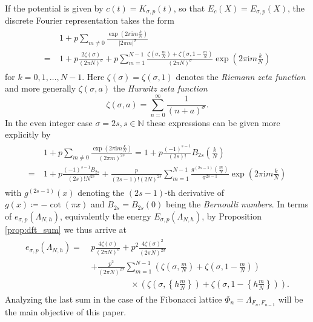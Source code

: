 \documentclass[]{interact}
\newcommand{\bbN}{\mathbb{N}}
\newcommand{\iu}{\mathrm{i}}
\theoremstyle{definition}
\numberwithin{table}{section} %
\numberwithin{figure}{section}
\begin{document}
If the potential is given by $c(t) = K_{\sigma, p}(t)$, so that $E_c(X) = E_{\sigma, p}(X)$, the discrete Fourier representation takes the form \cite{CK95}
\begin{align} \label{eq:dft_sigma}
    \begin{split}
        & 1 + p \sum_{m \neq 0} \frac{\exp\left(2\pi \iu m \frac kN\right)}{|2\pi m|^{\sigma}} \\
    = ~ & 1 + p \frac{2 \zeta(\sigma)}{(2\pi N)^{\sigma}} + p \sum_{m=1}^{N-1} \frac{\zeta\left(\sigma, \frac mN\right) + \zeta\left(\sigma, 1-\frac mN\right)}{(2 \pi N)^{\sigma}} \exp\left(2\pi\iu m \frac kN\right)
    \end{split}
\end{align}
for $k=0, 1, \dots, N-1$. Here $\zeta(\sigma) = \zeta(\sigma, 1)$ denotes the \emph{Riemann zeta function} and more generally $\zeta(\sigma, a)$ the \emph{Hurwitz zeta function}
$$
\zeta(\sigma, a) = \sum_{n=0}^\infty \frac1{(n+a)^\sigma}.
$$
In the even integer case $\sigma=2s, s \in \bbN$ these expressions can be given more explicitly by \cite{Cvi09}
\begin{align} \label{eq:Bernoulli_dft}
    \begin{split}
        & 1 + p \sum_{m \neq 0} \frac{\exp\left(2\pi\iu m \frac kN\right)}{(2 \pi m)^{2s}} = 1 + p \frac{(-1)^{s-1}}{(2s)!} B_{2s}\left(\frac kN\right) \\
    = ~ & 1 + p \frac{(-1)^{s-1}B_{2s}}{(2s)!N^{2s}} + \frac{p}{(2s-1)! (2N)^{2s}}\sum_{m=1}^{N-1} \frac{g^{(2s-1)}\left(\frac mN\right)}{\pi^{2s-1}} \exp\left(2\pi\iu m \frac kN\right)
    \end{split}
\end{align}
with $g^{(2s-1)}(x)$ denoting the $(2s-1)$-th derivative of $g(x) \coloneqq - \cot(\pi x)$ and $B_{2s} = B_{2s}(0)$ being the \emph{Bernoulli numbers}. In terms of $e_{\sigma, p}(\Lambda_{N,h})$, equivalently the energy $E_{\sigma, p}(\Lambda_{N, h})$, by Proposition \ref{prop:dft_sum} we thus arrive at
\begin{align} \label{eq:wce_expression}
    \begin{split}
        e_{\sigma, p}(\Lambda_{N, h})
    = ~ & p \frac{4 \zeta(\sigma)}{(2\pi N)^{\sigma}} + p^2 \frac{4 \zeta(\sigma)^2}{(2\pi N)^{2\sigma}} \\
    & + \frac{p^2}{(2\pi N)^{2\sigma}} \sum_{m=1}^{N-1} \left(\zeta\left(\sigma, \frac mN\right) + \zeta\left(\sigma, 1-\frac mN\right)\right) \\
    & ~~~~~~~~~~~~~~~~~~~~~ \times \left(\zeta\left(\sigma, \left\{h\frac mN\right\}\right) + \zeta\left(\sigma, 1-\left\{h\frac mN\right\}\right)\right).
    \end{split}
\end{align}
Analyzing the last sum in the case of the Fibonacci lattice $\Phi_n = \Lambda_{F_n, F_{n-1}}$ will be the main objective of this paper.
\end{document}
